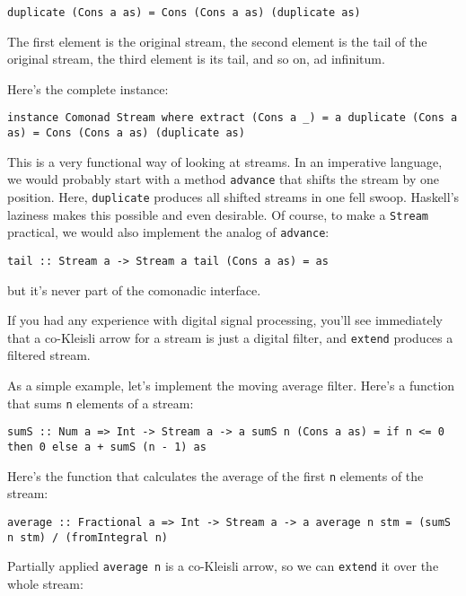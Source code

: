 \begin{verbatim}
duplicate (Cons a as) = Cons (Cons a as) (duplicate as)
\end{verbatim}

The first element is the original stream, the second element is the tail
of the original stream, the third element is its tail, and so on, ad
infinitum.

Here's the complete instance:

\begin{verbatim}
instance Comonad Stream where extract (Cons a _) = a duplicate (Cons a as) = Cons (Cons a as) (duplicate as)
\end{verbatim}

This is a very functional way of looking at streams. In an imperative
language, we would probably start with a method \texttt{advance} that
shifts the stream by one position. Here, \texttt{duplicate} produces all
shifted streams in one fell swoop. Haskell's laziness makes this
possible and even desirable. Of course, to make a \texttt{Stream}
practical, we would also implement the analog of \texttt{advance}:

\begin{verbatim}
tail :: Stream a -> Stream a tail (Cons a as) = as
\end{verbatim}

but it's never part of the comonadic interface.

If you had any experience with digital signal processing, you'll see
immediately that a co-Kleisli arrow for a stream is just a digital
filter, and \texttt{extend} produces a filtered stream.

As a simple example, let's implement the moving average filter. Here's a
function that sums \texttt{n} elements of a stream:

\begin{verbatim}
sumS :: Num a => Int -> Stream a -> a sumS n (Cons a as) = if n <= 0 then 0 else a + sumS (n - 1) as
\end{verbatim}

Here's the function that calculates the average of the first \texttt{n}
elements of the stream:

\begin{verbatim}
average :: Fractional a => Int -> Stream a -> a average n stm = (sumS n stm) / (fromIntegral n)
\end{verbatim}

Partially applied \texttt{average\ n} is a co-Kleisli arrow, so we can
\texttt{extend} it over the whole stream:


